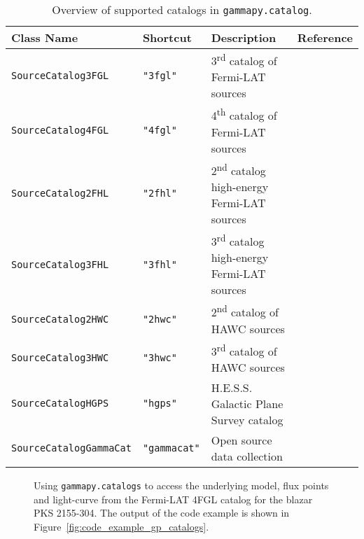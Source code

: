 \documentclass[longauth]{aa}
\newcommand{\code}[1]{\texttt{#1}}
\newcommand{\hess}{H.E.S.S.\xspace}
\newcommand{\hawc}{HAWC\xspace}
\newcommand{\fermi}{Fermi-LAT\xspace}
\begin{document}
\begin{table*}[ht!]
    \begin{center}
        \begin{tabular}{llll}
         \hline
         Class Name & Shortcut & Description & Reference\\
         \hline
         \code{SourceCatalog3FGL} & \code{"3fgl"} & 3\textsuperscript{rd} catalog of \fermi sources & \cite{3FGL} \\
         \code{SourceCatalog4FGL} & \code{"4fgl"} & 4\textsuperscript{th} catalog of \fermi  sources & \cite{4FGL} \\
         \code{SourceCatalog2FHL} & \code{"2fhl"} & 2\textsuperscript{nd} catalog high-energy \fermi  sources & \cite{2FHL} \\
         \code{SourceCatalog3FHL} & \code{"3fhl"} & 3\textsuperscript{rd} catalog high-energy \fermi  sources & \cite{3FHL} \\
         \code{SourceCatalog2HWC} & \code{"2hwc"} & 2\textsuperscript{nd} catalog of \hawc sources & \cite{2HWC} \\
         \code{SourceCatalog3HWC} & \code{"3hwc"} & 3\textsuperscript{rd} catalog of \hawc sources & \cite{3HWC} \\
         \code{SourceCatalogHGPS} & \code{"hgps"} & \hess Galactic Plane Survey catalog & \cite{HGPS} \\
         \code{SourceCatalogGammaCat} & \code{"gammacat"} & Open source data collection & \cite{gamma-cat} \\
         \hline
         \end{tabular}
    \end{center}
    \caption{Overview of supported catalogs in \code{gammapy.catalog}.}
    \label{tab:catalogs}
\end{table*}

\begin{figure}
        \small
        \caption{Using \code{gammapy.catalogs} to access the underlying model, flux points and
                light-curve from the \fermi 4FGL catalog for the blazar PKS 2155-304. The output
                of the code example is shown in Figure~\ref{fig:code_example_gp_catalogs}.
        }
        \label{fig*:minted:gp_catalogs}
\end{figure}

\end{document}
